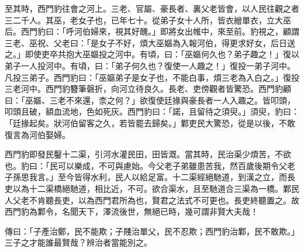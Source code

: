 \begin{pinyinscope}
至其時，西門豹往會之河上。三老、官屬、豪長者、裏父老皆會，以人民往觀之者三二千人。其巫，老女子也，已年七十。從弟子女十人所，皆衣繒單衣，立大巫后。西門豹曰：「呼河伯婦來，視其好醜。」即將女出帷中，來至前。豹視之，顧謂三老、巫祝、父老曰：「是女子不好，煩大巫嫗為入報河伯，得更求好女，后日送之。」即使吏卒共抱大巫嫗投之河中。有頃，曰：「巫嫗何久也？弟子趣之！」復以弟子一人投河中。有頃，曰：「弟子何久也？復使一人趣之！」復投一弟子河中。凡投三弟子。西門豹曰：「巫嫗弟子是女子也，不能白事，煩三老為入白之。」復投三老河中。西門豹簪筆磬折，向河立待良久。長老、吏傍觀者皆驚恐。西門豹顧曰：「巫嫗、三老不來還，柰之何？」欲復使廷掾與豪長者一人入趣之。皆叩頭，叩頭且破，額血流地，色如死灰。西門豹曰：「諾，且留待之須臾。」須臾，豹曰：「廷掾起矣。狀河伯留客之久，若皆罷去歸矣。」鄴吏民大驚恐，從是以後，不敢復言為河伯娶婦。

西門豹即發民鑿十二渠，引河水灌民田，田皆溉。當其時，民治渠少煩苦，不欲也。豹曰：「民可以樂成，不可與慮始。今父老子弟雖患苦我，然百歲後期令父老子孫思我言。」至今皆得水利，民人以給足富。十二渠經絕馳道，到漢之立，而長吏以為十二渠橋絕馳道，相比近，不可。欲合渠水，且至馳道合三渠為一橋。鄴民人父老不肯聽長吏，以為西門君所為也，賢君之法式不可更也。長吏終聽置之。故西門豹為鄴令，名聞天下，澤流後世，無絕已時，幾可謂非賢大夫哉！

傳曰：「子產治鄭，民不能欺；子賤治單父，民不忍欺；西門豹治鄴，民不敢欺。」三子之才能誰最賢哉？辨治者當能別之。


\end{pinyinscope}